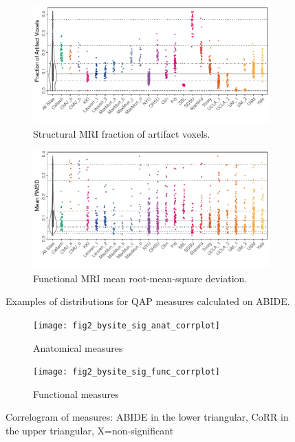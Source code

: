 \begin{figure}[!ht]
   \centering
   \begin{subfigure}[b]{1.0\textwidth}
     \includegraphics[width=180mm]{data_analysis/abid_anat_spat_Qi1.pdf}
     \caption{Structural MRI fraction of artifact voxels.}
   \end{subfigure}
   \begin{subfigure}[b]{1.0\textwidth}
     \includegraphics[width=180mm]{data_analysis/abid_func_RMSDMean.pdf}
     \caption{Functional MRI mean root-mean-square deviation.}
   \end{subfigure}
   \caption{Examples of distributions for QAP measures calculated on ABIDE.}
\end{figure}

\begin{figure}[!ht]
  \centering
     \begin{subfigure}[b]{0.4\textwidth}
       \texttt{[image: fig2\_bysite\_sig\_anat\_corrplot]}
       \caption{Anatomical measures}
     \end{subfigure}
     \begin{subfigure}[b]{0.4\textwidth}
       \texttt{[image: fig2\_bysite\_sig\_func\_corrplot]}
       \caption{Functional measures}
     \end{subfigure}
     \caption{Correlogram of measures: ABIDE in the lower triangular, CoRR in the upper triangular, X=non-significant}
\end{figure}

